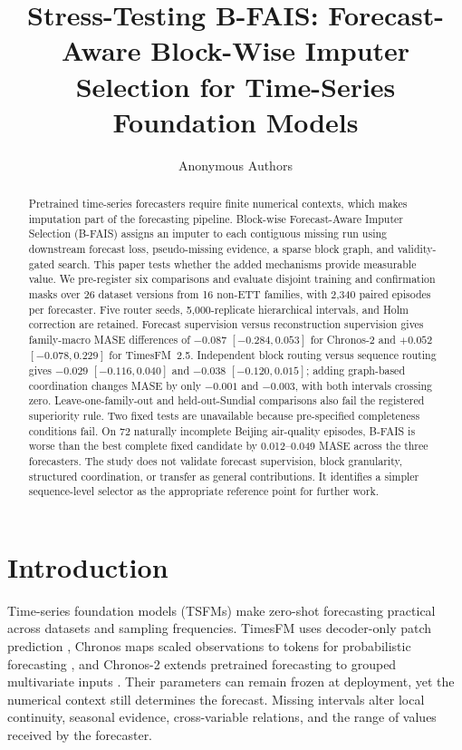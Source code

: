 \documentclass{article}
\title{Stress-Testing B-FAIS: Forecast-Aware Block-Wise Imputer Selection for Time-Series Foundation Models}
\author{Anonymous Authors}
\newcommand{\bfais}{\textsc{B-FAIS}\xspace}
\begin{document}
\maketitle

\begin{abstract}
Pretrained time-series forecasters require finite numerical contexts, which makes imputation part of the forecasting pipeline. Block-wise Forecast-Aware Imputer Selection (\bfais) assigns an imputer to each contiguous missing run using downstream forecast loss, pseudo-missing evidence, a sparse block graph, and validity-gated search. This paper tests whether the added mechanisms provide measurable value. We pre-register six comparisons and evaluate disjoint training and confirmation masks over 26 dataset versions from 16 non-ETT families, with 2,340 paired episodes per forecaster. Five router seeds, 5,000-replicate hierarchical intervals, and Holm correction are retained. Forecast supervision versus reconstruction supervision gives family-macro MASE differences of $-0.087$ $[-0.284,0.053]$ for Chronos-2 and $+0.052$ $[-0.078,0.229]$ for TimesFM~2.5. Independent block routing versus sequence routing gives $-0.029$ $[-0.116,0.040]$ and $-0.038$ $[-0.120,0.015]$; adding graph-based coordination changes MASE by only $-0.001$ and $-0.003$, with both intervals crossing zero. Leave-one-family-out and held-out-Sundial comparisons also fail the registered superiority rule. Two fixed tests are unavailable because pre-specified completeness conditions fail. On 72 naturally incomplete Beijing air-quality episodes, \bfais is worse than the best complete fixed candidate by 0.012--0.049 MASE across the three forecasters. The study does not validate forecast supervision, block granularity, structured coordination, or transfer as general contributions. It identifies a simpler sequence-level selector as the appropriate reference point for further work.
\end{abstract}

\section{Introduction}
\label{sec:introduction}

Time-series foundation models (TSFMs) make zero-shot forecasting practical across datasets and sampling frequencies. TimesFM uses decoder-only patch prediction \citep{das2024timesfm}, Chronos maps scaled observations to tokens for probabilistic forecasting \citep{ansari2024chronos}, and Chronos-2 extends pretrained forecasting to grouped multivariate inputs \citep{ansari2025chronos2}. Their parameters can remain frozen at deployment, yet the numerical context still determines the forecast. Missing intervals alter local continuity, seasonal evidence, cross-variable relations, and the range of values received by the forecaster.
\end{document}
